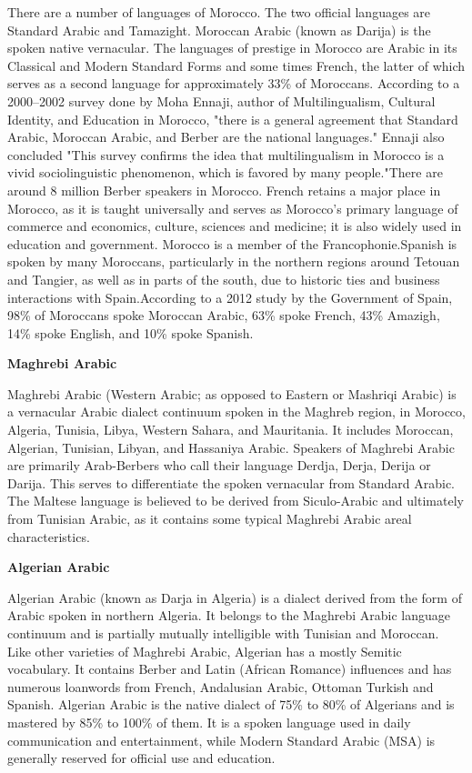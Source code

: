 \documentclass[11pt]{scrartcl} %
\begin{document}
There are a number of languages of Morocco. The two official languages are Standard Arabic and Tamazight. Moroccan Arabic (known as Darija) is the spoken native vernacular. The languages of prestige in Morocco are Arabic in its Classical and Modern Standard Forms and some times French, the latter of which serves as a second language for approximately 33\% of Moroccans. According to a 2000–2002 survey done by Moha Ennaji, author of Multilingualism, Cultural Identity, and Education in Morocco, "there is a general agreement that Standard Arabic, Moroccan Arabic, and Berber are the national languages." Ennaji also concluded "This survey confirms the idea that multilingualism in Morocco is a vivid sociolinguistic phenomenon, which is favored by many people."There are around 8 million Berber speakers in Morocco. French retains a major place in Morocco, as it is taught universally and serves as Morocco's primary language of commerce and economics, culture, sciences and medicine; it is also widely used in education and government. Morocco is a member of the Francophonie.Spanish is spoken by many Moroccans, particularly in the northern regions around Tetouan and Tangier, as well as in parts of the south, due to historic ties and business interactions with Spain.According to a 2012 study by the Government of Spain, 98\% of Moroccans spoke Moroccan Arabic, 63\% spoke French, 43\% Amazigh, 14\% spoke English, and 10\% spoke Spanish. \par

\noindent \textbf{Maghrebi Arabic} \par

Maghrebi Arabic (Western Arabic; as opposed to Eastern or Mashriqi Arabic) is a vernacular Arabic dialect continuum spoken in the Maghreb region, in Morocco, Algeria, Tunisia, Libya, Western Sahara, and Mauritania. It includes Moroccan, Algerian, Tunisian, Libyan, and Hassaniya Arabic. Speakers of Maghrebi Arabic are primarily Arab-Berbers who call their language Derdja, Derja, Derija or Darija. This serves to differentiate the spoken vernacular from Standard Arabic. The Maltese language is believed to be derived from Siculo-Arabic and ultimately from Tunisian Arabic, as it contains some typical Maghrebi Arabic areal characteristics. \par

\noindent \textbf{Algerian Arabic} \par

Algerian Arabic (known as Darja in Algeria) is a dialect derived from the form of Arabic spoken in northern Algeria. It belongs to the Maghrebi Arabic language continuum and is partially mutually intelligible with Tunisian and Moroccan. Like other varieties of Maghrebi Arabic, Algerian has a mostly Semitic vocabulary. It contains Berber and Latin (African Romance) influences and has numerous loanwords from French, Andalusian Arabic, Ottoman Turkish and Spanish. Algerian Arabic is the native dialect of 75\% to 80\% of Algerians and is mastered by 85\% to 100\% of them. It is a spoken language used in daily communication and entertainment, while Modern Standard Arabic (MSA) is generally reserved for official use and education. \par
\end{document}
